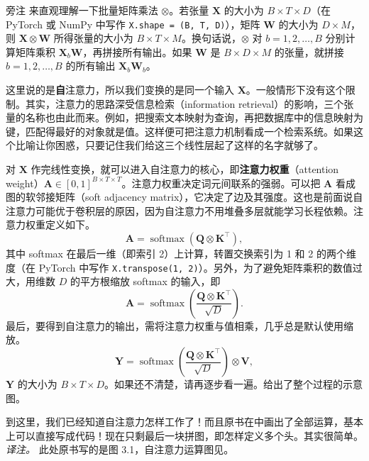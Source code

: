 \begin{booknote}{旁注}
来直观理解一下批量矩阵乘法 $\otimes$。若张量 $\mathbf{X}$ 的大小为 $B\times T\times D$（在 PyTorch 或 NumPy 中写作 \texttt{X.shape = (B, T, D)}），矩阵 $\mathbf{W}$ 的大小为 $D\times M$，则 $\mathbf{X}\otimes\mathbf{W}$ 所得张量的大小为 $B\times T\times M$。换句话说，$\otimes$ 对 $b=1,2,\ldots,B$ 分别计算矩阵乘积 $\mathbf{X}_b\mathbf{W}$，再拼接所有输出。如果 $\mathbf{W}$ 是 $B\times D\times M$ 的张量，就拼接 $b=1,2,\ldots,B$ 的所有输出 $\mathbf{X}_b\mathbf{W}_b$。
\end{booknote}

这里说的是\textbf{自}注意力，所以我们变换的是同一个输入 $\mathbf{X}$。一般情形下没有这个限制。其实，注意力的思路深受信息检索（information retrieval）的影响，三个张量的名称也由此而来。例如，把搜索文本映射为查询，再把数据库中的信息映射为键，匹配得最好的对象就是值。这样便可把注意力机制看成一个检索系统。如果这个比喻让你困惑，只要记住我们给这三个线性层起了这样的名字就够了。

对 $\mathbf{X}$ 作完线性变换，就可以进入自注意力的核心，即\textbf{注意力权重}（attention weight）$\mathbf{A}\in[0,1]^{B\times T\times T}$。注意力权重决定词元间联系的强弱。可以把 $\mathbf{A}$ 看成图的软邻接矩阵（soft adjacency matrix），它决定了边及其强度。这也是前面说自注意力可能优于卷积层的原因，因为自注意力不用堆叠多层就能学习长程依赖。注意力权重定义如下。
\begin{equation}
\mathbf{A}=\operatorname{softmax}(\mathbf{Q}\otimes\mathbf{K}^\top),
\tag{3.17}\label{eq:03-17}
\end{equation}
其中 softmax 在最后一维（即索引 2）上计算，转置交换索引为 1 和 2 的两个维度（在 PyTorch 中写作 \texttt{X.transpose(1, 2)}）。另外，为了避免矩阵乘积的数值过大，用维数 $D$ 的平方根缩放 softmax 的输入，即
\begin{equation}
\mathbf{A}=\operatorname{softmax}\left(\frac{\mathbf{Q}\otimes\mathbf{K}^\top}{\sqrt{D}}\right).
\tag{3.18}\label{eq:03-18}
\end{equation}
最后，要得到自注意力的输出，需将注意力权重与值相乘，几乎总是默认使用缩放。
\begin{equation}
\mathbf{Y}=\operatorname{softmax}\left(\frac{\mathbf{Q}\otimes\mathbf{K}^\top}{\sqrt{D}}\right)\otimes\mathbf{V},
\tag{3.19}\label{eq:03-19}
\end{equation}
$\mathbf{Y}$ 的大小为 $B\times T\times D$。如果还不清楚，请再逐步看一遍。给出了整个过程的示意图。

到这里，我们已经知道自注意力怎样工作了！而且原书在中画出了全部运算，基本上可以直接写成代码！现在只剩最后一块拼图，即怎样定义多个头。其实很简单。
\emph{译注。} 此处原书写的是图 3.1，自注意力运算图见。

